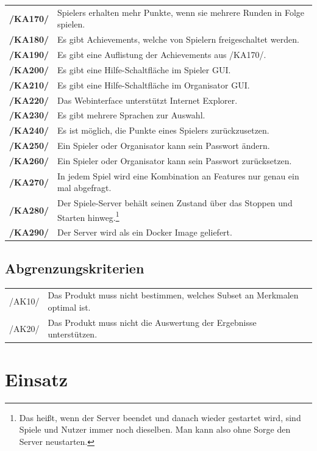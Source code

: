 \documentclass[a4paper]{scrreprt}
\begin{document}
\begin{tabularx}{\linewidth}{@{}>{\bfseries}l@{\hspace{.5em}}X@{}}
        /KA170/ & \Glspl{Spieler} erhalten mehr Punkte, wenn sie mehrere Runden in Folge spielen. \\
        /KA180/ & Es gibt \Gls{Achievement}s, welche von Spielern freigeschaltet werden. \\
        /KA190/ & Es gibt eine Auflistung der \Gls{Achievement}s aus /KA170/. \\
        /KA200/ & Es gibt eine Hilfe-Schaltfläche im \Gls{Spieler} GUI. \\
        /KA210/ & Es gibt eine Hilfe-Schaltfläche im \Gls{Organisator} GUI. \\
        /KA220/ & Das Webinterface unterstützt Internet Explorer. \\
        /KA230/ & Es gibt mehrere Sprachen zur Auswahl. \\
        /KA240/ & Es ist möglich, die Punkte eines \Gls{Spieler}s zurückzusetzen. \\ %
        /KA250/ & Ein Spieler oder Organisator kann sein Passwort ändern. \\
        /KA260/ & Ein Spieler oder Organisator kann sein Passwort zurücksetzen. \\
        /KA270/ & In jedem Spiel wird eine Kombination an Features nur genau ein mal abgefragt.\\
        /KA280/ & Der \Gls{Spiele-Server} behält seinen Zustand über das Stoppen und Starten hinweg.\footnote{Das heißt, wenn der Server beendet und danach wieder gestartet wird,
 sind Spiele und Nutzer immer noch dieselben. Man kann also ohne Sorge den Server neustarten.} \\
        /KA290/ & Der Server wird als ein Docker Image geliefert.\footnotemark \\
    \end{tabularx}

    \section{Abgrenzungskriterien}
    \begin{tabular}{ l l}
    /AK10/ & Das Produkt muss nicht bestimmen, welches Subset an Merkmalen optimal ist.\\
    /AK20/ & Das Produkt muss nicht die Auswertung der Ergebnisse unterstützen.\\
    \end{tabular}

    \chapter{Einsatz}
\end{document}
